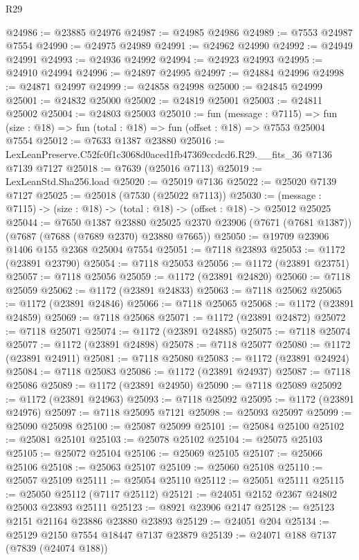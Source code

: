 \begin{lexlean}{R29}
\begin{coremodule}
@24986 := @23885 @24976
@24987 := @24985 @24986
@24989 := @7553 @24987 @7554
@24990 := @24975 @24989
@24991 := @24962 @24990
@24992 := @24949 @24991
@24993 := @24936 @24992
@24994 := @24923 @24993
@24995 := @24910 @24994
@24996 := @24897 @24995
@24997 := @24884 @24996
@24998 := @24871 @24997
@24999 := @24858 @24998
@25000 := @24845 @24999
@25001 := @24832 @25000
@25002 := @24819 @25001
@25003 := @24811 @25002
@25004 := @24803 @25003
@25010 := fun (message : @7115) =>
  fun (size : @18) => fun (total : @18) => fun (offset : @18) => @7553 @25004 @7554
@25012 := @7633 @1387 @23880
@25016 := LexLeanPreserve.C52fc0f1c3068d0aced1fb47369ccdcd6.R29.__fits_36 @7136 @7139 @7127
@25018 := @7639 (@25016 @7113)
@25019 := LexLeanStd.Sha256.load
@25020 := @25019 @7136
@25022 := @25020 @7139 @7127
@25025 := @25018 (@7530 (@25022 @7113))
@25030 := (message : @7115) -> (size : @18) -> (total : @18) -> (offset : @18) -> @25012 @25025
@25044 := @7650
    @1387
    @23880
    @25025
    @2370
    @23906
    (@7671 (@7681 @1387))
    (@7687 (@7688 (@7689 @2370) @23880 @7665))
@25050 := @19709 @23906 @1406 @155 @2368 @25004 @7554
@25051 := @7118 @23893
@25053 := @1172 (@23891 @23790)
@25054 := @7118 @25053
@25056 := @1172 (@23891 @23751)
@25057 := @7118 @25056
@25059 := @1172 (@23891 @24820)
@25060 := @7118 @25059
@25062 := @1172 (@23891 @24833)
@25063 := @7118 @25062
@25065 := @1172 (@23891 @24846)
@25066 := @7118 @25065
@25068 := @1172 (@23891 @24859)
@25069 := @7118 @25068
@25071 := @1172 (@23891 @24872)
@25072 := @7118 @25071
@25074 := @1172 (@23891 @24885)
@25075 := @7118 @25074
@25077 := @1172 (@23891 @24898)
@25078 := @7118 @25077
@25080 := @1172 (@23891 @24911)
@25081 := @7118 @25080
@25083 := @1172 (@23891 @24924)
@25084 := @7118 @25083
@25086 := @1172 (@23891 @24937)
@25087 := @7118 @25086
@25089 := @1172 (@23891 @24950)
@25090 := @7118 @25089
@25092 := @1172 (@23891 @24963)
@25093 := @7118 @25092
@25095 := @1172 (@23891 @24976)
@25097 := @7118 @25095 @7121
@25098 := @25093 @25097
@25099 := @25090 @25098
@25100 := @25087 @25099
@25101 := @25084 @25100
@25102 := @25081 @25101
@25103 := @25078 @25102
@25104 := @25075 @25103
@25105 := @25072 @25104
@25106 := @25069 @25105
@25107 := @25066 @25106
@25108 := @25063 @25107
@25109 := @25060 @25108
@25110 := @25057 @25109
@25111 := @25054 @25110
@25112 := @25051 @25111
@25115 := @25050 @25112 (@7117 @25112)
@25121 := @24051 @2152 @2367 @24802 @25003 @23893 @25111
@25123 := @8921 @23906 @2147
@25128 := @25123 @2151 @21164 @23886 @23880 @23893
@25129 := @24051 @204
@25134 := @25129 @2150 @7554 @18447 @7137 @23879
@25139 := @24071 @188 @7137 (@7839 (@24074 @188))

\end{coremodule}
\end{lexlean}
